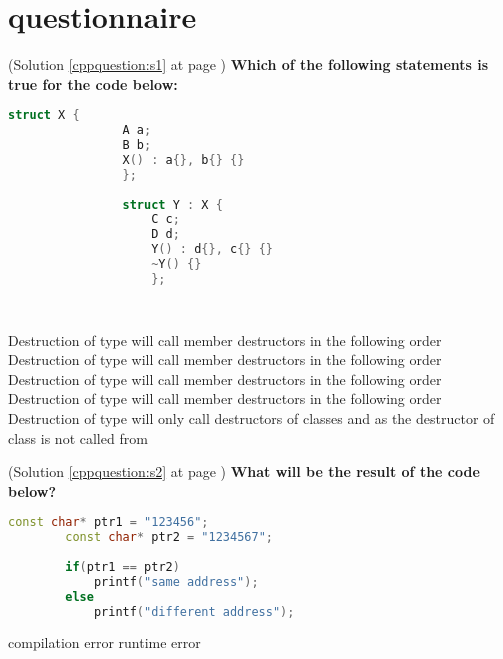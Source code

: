 \chapter{\CC questionnaire}
   
    \begin{cppquestion}
        \label{cppquestion:q1}
        (Solution \ref{cppquestion:s1} at page \pageref{cppquestion:s1})
        \question \textbf{Which of the following statements is true for the code below:} 
        \begin{lstlisting}[language=c++,numbers=none, caption={}]
            struct X {
                A a;
                B b;
                X() : a{}, b{} {}
                };
                
                struct Y : X {
                    C c;
                    D d;
                    Y() : d{}, c{} {}
                    ~Y() {}
                    };
                    
                    
                \end{lstlisting} 
                \begin{choices}
                    \choice Destruction of type  will call member destructors in the following order 
                    \choice Destruction of type  will call member destructors in the following order 
                    \choice Destruction of type  will call member destructors in the following order 
                    \choice Destruction of type  will call member destructors in the following order 
                    \choice Destruction of type  will only call destructors of classes  and  as the destructor of class  is not called from 
                \end{choices}
        \end{cppquestion}
            
\begin{cppquestion}
    \label{cppquestion:q2}
    (Solution \ref{cppquestion:s2} at page \pageref{cppquestion:s2}) 
    \question \textbf{What will be the result of the code below?} 
    \begin{lstlisting}[language=c++,numbers=none, caption={}]
        const char* ptr1 = "123456";
        const char* ptr2 = "1234567";
        
        if(ptr1 == ptr2)
            printf("same address");
        else
            printf("different address");
        \end{lstlisting} 
    \begin{choices}
    \choice {}
    \choice {}
    \choice compilation error
    \choice runtime error
    \end{choices}
\end{cppquestion}


